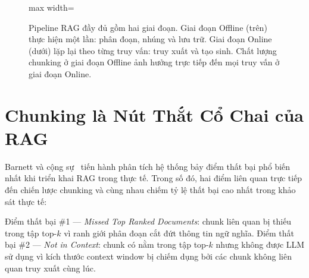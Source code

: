\documentclass[12pt,a4paper]{report}
\theoremstyle{plain}
\theoremstyle{definition}
\begin{document}
\begin{figure}[htbp]
\begin{adjustbox}{max width=\linewidth}
		\end{adjustbox}
		\caption{Pipeline RAG đầy đủ gồm hai giai đoạn. Giai đoạn Offline
			(trên) thực hiện một lần: phân đoạn, nhúng và lưu trữ. Giai đoạn
			Online (dưới) lặp lại theo từng truy vấn: truy xuất và tạo sinh.
			Chất lượng chunking ở giai đoạn Offline ảnh hưởng trực tiếp đến
			mọi truy vấn ở giai đoạn Online.}
		\label{fig:rag_pipeline_full}
	\end{figure}
	
	\section{Chunking là Nút Thắt Cổ Chai của RAG}
	\label{sec:chunking_bottleneck}
	
	Barnett và cộng sự~\cite{barnett2024seven} tiến hành phân tích hệ thống bảy
	điểm thất bại phổ biến nhất khi triển khai RAG trong thực tế. Trong số đó,
	hai điểm liên quan trực tiếp đến chiến lược chunking và cùng nhau chiếm tỷ
	lệ thất bại cao nhất trong khảo sát thực tế:
	
	Điểm thất bại \#1 --- \emph{Missed Top Ranked Documents}: chunk liên quan
	bị thiếu trong tập top-$k$ vì ranh giới phân đoạn cắt đứt thông tin ngữ
	nghĩa. Điểm thất bại \#2 --- \emph{Not in Context}: chunk có nằm trong
	tập top-$k$ nhưng không được LLM sử dụng vì kích thước context window bị
	chiếm dụng bởi các chunk không liên quan truy xuất cùng lúc.
	
\end{document}
